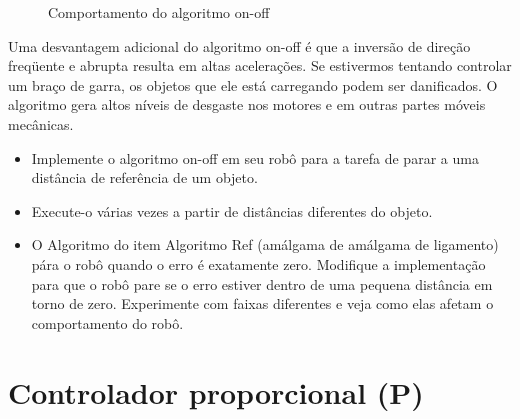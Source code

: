 \begin{figure}
\begin{center}
\caption{Comportamento do algoritmo on-off}\label{fig.onoff}
\end{center}
\end{figure}

Uma desvantagem adicional do algoritmo on-off é que a inversão de direção freqüente e abrupta resulta em altas acelerações. Se estivermos tentando controlar um braço de garra, os objetos que ele está carregando podem ser danificados. O algoritmo gera altos níveis de desgaste nos motores e em outras partes móveis mecânicas.

\begin{framed}
\begin{itemize}
\item Implemente o algoritmo on-off em seu robô para a tarefa de parar a uma distância de referência de um objeto.
\item Execute-o várias vezes a partir de distâncias diferentes do objeto.
\item O Algoritmo do item Algoritmo Ref (amálgama de amálgama de ligamento) pára o robô quando o erro é exatamente zero. Modifique a implementação para que o robô pare se o erro estiver dentro de uma pequena distância em torno de zero. Experimente com faixas diferentes e veja como elas afetam o comportamento do robô.
\end{itemize}
\end{framed}

\section{Controlador proporcional (P)}\label{s.p}

